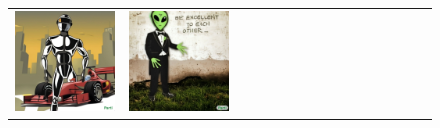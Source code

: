 \begin{figure}
\begin{adjustwidth}{-0.8in}{-0.5in}
\begin{tabular}{cccccccccccccccccccc}
\multicolumn{3}{c}{\includegraphics[width=\twobytwocolwidth\textwidth]{figures/limitations/robot_impossible.jpg}} &
\multicolumn{3}{c}{\includegraphics[width=\twobytwocolwidth\textwidth]{figures/limitations/alien_impossible.jpg}} \\

\end{tabular}
\end{adjustwidth}
\end{figure}
